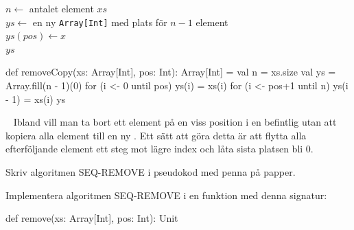 {\SubtaskSolved

\begin{algorithm}[H]

 $n \leftarrow$ antalet element $xs$\\
 $ys \leftarrow$ en ny \texttt{Array[Int]} med plats för $n-1$ element \\
 $ys(pos) \leftarrow x$ \\
 \Return $ys$
\end{algorithm}

\SubtaskSolved  \begin{Code}
def removeCopy(xs: Array[Int], pos: Int): Array[Int] = {
  val n = xs.size
  val ys = Array.fill(n - 1)(0)
  for (i <- 0 until pos) ys(i) = xs(i)
  for (i <- pos+1 until n) ys(i - 1) = xs(i)
  ys
}
\end{Code}



\QUESTEND









\QUESTBEGIN

\Task  \what~  Ibland vill man ta bort ett element på en viss position i en befintlig  utan att kopiera alla element till en ny . Ett sätt att göra detta är att flytta alla efterföljande element ett steg mot lägre index och låta sista platsen bli 0.

\Subtask\Pen Skriv algoritmen SEQ-REMOVE i pseudokod med penna på papper.

\Subtask Implementera algoritmen SEQ-REMOVE i en funktion med denna signatur:
\begin{Code}
def remove(xs: Array[Int], pos: Int): Unit
\end{Code}




\SOLUTION


\TaskSolved \what


\SubtaskSolved

}
